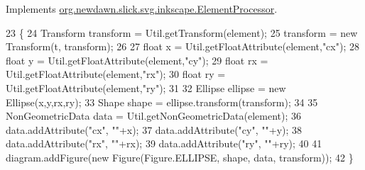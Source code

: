 Implements \mbox{\hyperlink{interfaceorg_1_1newdawn_1_1slick_1_1svg_1_1inkscape_1_1_element_processor_acd170a9e1119481edae885780db59a2e}{org.\+newdawn.\+slick.\+svg.\+inkscape.\+Element\+Processor}}.


\begin{DoxyCode}
23                                                                                                            
         \{
24         Transform transform = Util.getTransform(element);
25         transform = \textcolor{keyword}{new} Transform(t, transform);
26         
27         \textcolor{keywordtype}{float} x = Util.getFloatAttribute(element,\textcolor{stringliteral}{"cx"});
28         \textcolor{keywordtype}{float} y = Util.getFloatAttribute(element,\textcolor{stringliteral}{"cy"});
29         \textcolor{keywordtype}{float} rx = Util.getFloatAttribute(element,\textcolor{stringliteral}{"rx"});
30         \textcolor{keywordtype}{float} ry = Util.getFloatAttribute(element,\textcolor{stringliteral}{"ry"});
31         
32         Ellipse ellipse = \textcolor{keyword}{new} Ellipse(x,y,rx,ry);
33         Shape shape = ellipse.transform(transform);
34 
35         NonGeometricData data = Util.getNonGeometricData(element);
36         data.addAttribute(\textcolor{stringliteral}{"cx"}, \textcolor{stringliteral}{""}+x);
37         data.addAttribute(\textcolor{stringliteral}{"cy"}, \textcolor{stringliteral}{""}+y);
38         data.addAttribute(\textcolor{stringliteral}{"rx"}, \textcolor{stringliteral}{""}+rx);
39         data.addAttribute(\textcolor{stringliteral}{"ry"}, \textcolor{stringliteral}{""}+ry);
40         
41         diagram.addFigure(\textcolor{keyword}{new} Figure(Figure.ELLIPSE, shape, data, transform));
42     \}
\end{DoxyCode}
